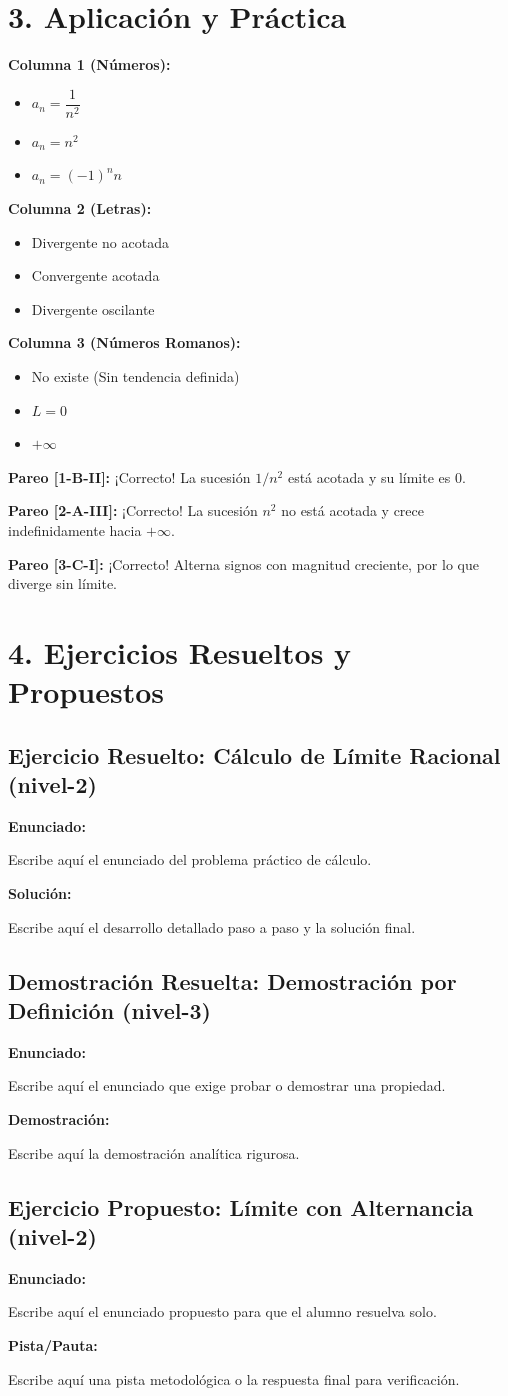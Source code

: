 \documentclass[11pt]{article}
\newenvironment{aplicacion}{%
  \section*{3. Aplicación y Práctica}%
}{}
\newenvironment{ejercicios}{%
  \section*{4. Ejercicios Resueltos y Propuestos}%
}{}
\newenvironment{ejercicioresuelto}[2]{%
  \subsection*{Ejercicio Resuelto: #1 \hfill \normalfont\small(#2)}%
}{}
\newcommand{\enunciado}[1]{%
  \textbf{Enunciado:}\par#1\par\medskip
}
\newcommand{\solucion}[1]{%
  \textbf{Solución:}\par#1\par\bigskip
}
\newenvironment{ejerciciodemostracion}[2]{%
  \subsection*{Demostración Resuelta: #1 \hfill \normalfont\small(#2)}%
}{}
\newcommand{\demostracion}[1]{%
  \textbf{Demostración:}\par#1\par\bigskip
}
\newenvironment{ejerciciopropuesto}[2]{%
  \subsection*{Ejercicio Propuesto: #1 \hfill \normalfont\small(#2)}%
}{}
\newcommand{\pista}[1]{%
  \textbf{Pista/Pauta:}\par#1\par\bigskip
}
\newenvironment{pareadostrescolumnas}[1]{%
  \begin{tcolorbox}[colback=teal!5,colframe=teal!75!black,title=Términos Pareados (3 Columnas): #1]%
}{%
  \end{tcolorbox}%
}
\newcommand{\columnaI}[1]{%
  \par\medskip
  \textbf{Columna 1 (Números):}\par
  \begin{itemize}
    #1
  \end{itemize}%
}
\newcommand{\columnaII}[1]{%
  \par\medskip
  \textbf{Columna 2 (Letras):}\par
  \begin{itemize}
    #1
  \end{itemize}%
}
\newcommand{\columnaIII}[1]{%
  \par\medskip
  \textbf{Columna 3 (Números Romanos):}\par
  \begin{itemize}
    #1
  \end{itemize}%
}
\newcommand{\pareotres}[2]{%
  \par\smallskip
  \textbf{Pareo [#1]:} #2\par
}
\begin{document}
\begin{aplicacion}
\begin{pareadostrescolumnas}{Clasificación Completa de Sucesiones}
    \columnaI{
      \item[1.] $a_n = \dfrac{1}{n^2}$
      \item[2.] $a_n = n^2$
      \item[3.] $a_n = (-1)^n n$
    }
    \columnaII{
      \item[A.] Divergente no acotada
      \item[B.] Convergente acotada
      \item[C.] Divergente oscilante
    }
    \columnaIII{
      \item[I.] No existe (Sin tendencia definida)
      \item[II.] $L = 0$
      \item[III.] $+\infty$
    }
    
    \pareotres{1-B-II}{¡Correcto! La sucesión $1/n^2$ está acotada y su límite es 0.}
    \pareotres{2-A-III}{¡Correcto! La sucesión $n^2$ no está acotada y crece indefinidamente hacia $+\infty$.}
    \pareotres{3-C-I}{¡Correcto! Alterna signos con magnitud creciente, por lo que diverge sin límite.}
  \end{pareadostrescolumnas}

\end{aplicacion}


\begin{ejercicios}

  \begin{ejercicioresuelto}{Cálculo de Límite Racional}{nivel-2}
    \enunciado{
      Escribe aquí el enunciado del problema práctico de cálculo.
    }
    \solucion{
      Escribe aquí el desarrollo detallado paso a paso y la solución final.
    }
  \end{ejercicioresuelto}

  \begin{ejerciciodemostracion}{Demostración por Definición}{nivel-3}
    \enunciado{
      Escribe aquí el enunciado que exige probar o demostrar una propiedad.
    }
    \demostracion{
      Escribe aquí la demostración analítica rigurosa.
    }
  \end{ejerciciodemostracion}

  \begin{ejerciciopropuesto}{Límite con Alternancia}{nivel-2}
    \enunciado{
      Escribe aquí el enunciado propuesto para que el alumno resuelva solo.
    }
    \pista{
      Escribe aquí una pista metodológica o la respuesta final para verificación.
    }
  \end{ejerciciopropuesto}

\end{ejercicios}
\end{document}
